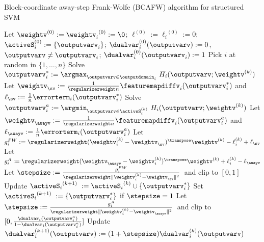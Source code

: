 \documentclass{article}
\begin{document}
\begin{algorithm}[t]
    \caption{Block-coordinate away-step Frank-Wolfe (BCAFW) algorithm for structured SVM}%
    \label{alg:aFW_product_SVM_away_steps}
\begin{algorithmic}[1]
        \STATE Let $\weightv^{(0)}:= {\weightv_i}^{(0)}:= \0$; \; $\ell^{(0)}:={\ell_i}^{(0)}:=0$;
        \STATE $\activeS_i^{(0)}:=\{\outputvarv_i\}$;
        \STATE $\dualvar_i^{(0)}(\outputvarv):=0$, $\outputvarv\neq \outputvarv_i$; \; $\dualvar_i^{(0)}(\outputvarv_i):=1$
                \STATE Pick $i$ at random in $\{1,\ldots,n\}$ 
                \STATE Solve $\outputvarv_i^* := \displaystyle\argmax_{\outputvarv\in\outputdomain_i} \ H_i(\outputvarv;\weightv^{(k)})$ %
                \STATE Let $\weightv_{\sv} := \frac1{\regularizerweight n} \featuremapdiffv_i(\outputvarv_i^*)$ \;
                and \; $\ell_{\sv} := \frac1n \errorterm_i(\outputvarv_i^*)$
                 \STATE Solve $\outputvarv_i^a := \displaystyle\argmin_{\outputvarv\in\activeS_i^{(k)}} \ H_i(\outputvarv;\weightv^{(k)})$ 
                \STATE Let $\weightv_{\awayv} := \frac1{\regularizerweight n} \featuremapdiffv_i(\outputvarv_i^a)$ \;
                and \; $\ell_{\awayv} := \frac1n \errorterm_i(\outputvarv_i^a)$
				\STATE Let $g_i^{FW} :=  \regularizerweight (\weightv_i^{(k)}-\weightv_{\sv})^\transpose \weightv^{(k)} - \ell_i^{(k)} + \ell_{\sv}$ \label{alg:FW_product_SVM_away_steps:block_gap}
                \STATE Let $g_i^{A} :=  \regularizerweight (\weightv_{\awayv}-\weightv_i^{(k)})^\transpose \weightv^{(k)} + \ell_i^{(k)} - \ell_{\awayv}$\label{alg:FW_product_SVM_away_steps:away_gap}\vspace{1.5mm}
				 \label{alg:aFW_product_SVM_startA}  
                \STATE Let $\stepsize := \frac{g_i^{FW}}{ \regularizerweight \|\weightv_i^{(k)}-\weightv_{\sv}\|^2}$~and clip to $[0,1]$
		  			\STATE Update ${\activeS_i}^{(k+1)}\;:= {\activeS_i}^{(k)} \cup \{\outputvarv_i^* \}$
                     \STATE Set ${\activeS_i}^{(k+1)}\;:= \{\outputvarv_i^* \}$ if $\stepsize=1$
		  		\ELSE {}
                    \STATE Let $\stepsize := \frac{g_i^{A}}{ \regularizerweight \|\weightv_i^{(k)}-\weightv_{\awayv}\|^2}$~and clip to $[0,\frac{\dualvar_i(\outputvarv_i^a)}{1-\dualvar_i(\outputvarv_i^a)}]$
		  			\STATE Update {\small~ $\dualvar_i^{(k+1)}(\outputvarv):= (1+\stepsize)\dualvar_i^{(k)}(\outputvarv)$}
                     		  							 	
		  			

\end{algorithmic}
\end{algorithm}
\end{document}
